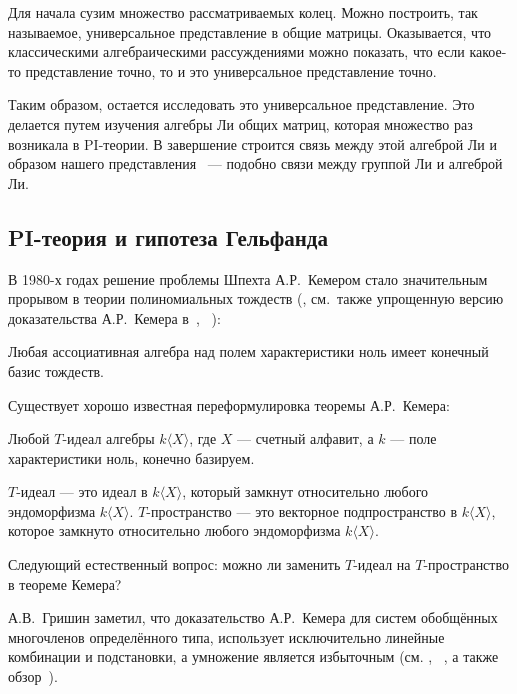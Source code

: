 Для начала сузим множество рассматриваемых колец.
Можно построить, так называемое, универсальное представление в общие матрицы.
Оказывается, что классическими алгебраическими рассуждениями можно показать, что если какое-то представление точно, то и это универсальное представление точно.

Таким образом, остается исследовать это универсальное представление.
Это делается путем изучения алгебры Ли общих матриц, которая множество раз возникала в PI-теории.
В завершение строится связь между этой алгеброй Ли и образом нашего представления ~--- подобно связи между группой Ли и алгеброй Ли.

\subsection{PI-теория и гипотеза Гельфанда}\label{subsec:introduction-gelfand}
В 1980-х годах решение проблемы Шпехта А.Р.\ Кемером стало значительным прорывом в теории полиномиальных тождеств (\cite{Kemer}, см.\ также упрощенную версию доказательства А.Р.\ Кемера в~\cite{SimpleKemer}, ~\cite{Procesi}):
\vskip 0.1in\noindent
\begin{theorem*} [А.Р. Кемер, 1987]
    Любая ассоциативная алгебра над полем характеристики ноль имеет конечный базис тождеств.
\end{theorem*}
\vskip 0.1in\noindent

Существует хорошо известная переформулировка теоремы А.Р.\ Кемера:

\vskip 0.1in\noindent
\begin{theorem*}
    Любой $T$-идеал алгебры $k\langle X\rangle$, где $X$ — счетный алфавит, а $k$ — поле характеристики ноль, конечно базируем.
\end{theorem*}
\vskip 0.1in\noindent

$T$-идеал — это идеал в $k\langle X\rangle$, который замкнут относительно любого эндоморфизма $k\langle X\rangle$.
$T$-пространство — это векторное подпространство в $k\langle X\rangle$, которое замкнуто относительно любого эндоморфизма $k\langle X\rangle$.

Следующий естественный вопрос: можно ли заменить $T$-идеал на $T$-пространство в теореме Кемера?

А.В.\ Гришин заметил, что доказательство А.Р.\ Кемера для систем обобщённых многочленов определённого типа, использует исключительно линейные комбинации и подстановки, а умножение является избыточным (см. \cite{Grishin}, ~\cite{Grishin2}, а также обзор~\cite{GrishinSchigolev}).

